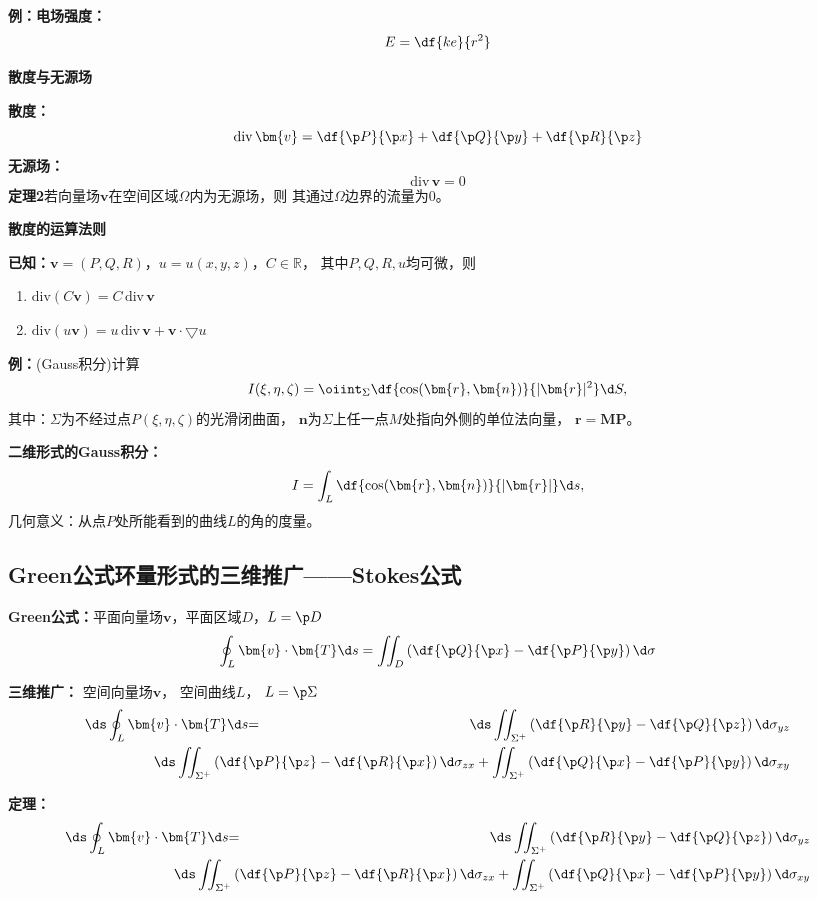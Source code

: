 {\bf 例：}{\bf 电场强度：}
$${E=\df{ke}{r^2}}$$

{\bf 散度与无源场}

{\bf 散度：}
$${\mathrm{div}\,\bm{v}=\df{\p P}{\p x}+\df{\p Q}{\p y}+\df{\p R}{\p
z}}$$ 
{\bf 无源场：}
$${\mathrm{div}\,\bm{v}=0}$$ 
{\bf 定理2}若向量场$\bm{v}$在空间区域$\Omega$内为无源场，则
其通过$\Omega$边界的流量为$0$。

{\bf 散度的运算法则}

{\bf 已知：}$\bm{v}=(P,Q,R)$，$u=u(x,y,z)$，$C\in\mathbb{R}$， 
其中$P,Q,R,u$均可微，则 
\begin{enumerate}[(1)]
  \setlength{\itemindent}{1cm}
  \item ${\mathrm{div}(C\bm{v}) =C\,\mathrm{div}\,\bm{v}}$ 
  \item ${\mathrm{div}(u\bm{v}) =u\,\mathrm{div}\,\bm{v}
  +\bm{v}\cdot\bigtriangledown u}$
\end{enumerate}

{\bf 例：}(Gauss积分)计算
$$I(\xi,\eta,\zeta)=\oiint_{\Sigma}
\df{\cos(\bm{r},\bm{n})}{|\bm{r}|^2}\d S,$$
其中：$\Sigma$为不经过点$P(\xi,\eta,\zeta)$的光滑闭曲面，
$\bm{n}$为$\Sigma$上任一点$M$处指向外侧的单位法向量，
$\bm{r}=\bm{MP}$。

{\bf 二维形式的Gauss积分：}
$$I=\int_L\df{\cos(\bm{r},\bm{n})}{|\bm{r}|}\d s,$$
几何意义：从点$P$处所能看到的曲线$L$的角的度量。

\subsection{Green公式环量形式的三维推广——Stokes公式}

{\bf Green公式：}平面向量场$\bm{v}$，平面区域$D$，$L=\p D$ 
$${\oint_L\bm{v}\cdot\bm{T}\d s=\iint_D
\left(\df{\p Q}{\p x}-\df{\p P}{\p y}\right)\d\sigma}$$
 
{\bf 三维推广：} 空间向量场$\bm{v}$， 空间曲线$L$， $L=\p\Sigma$ 
\begin{eqnarray*}
	{\ds\oint_L\bm{v}\cdot\bm{T}\d s}&{=}&
	{\ds\iint_{\Sigma^+}\left(\df{\p R}{\p y}-\df{\p Q}{\p
	z}\right)\d\sigma_{yz}}\\ 
	&& {\hspace{-3cm}\ds\iint_{\Sigma^+}\left(\df{\p P}{\p
	z}-\df{\p R}{\p x}\right)\d\sigma_{zx}
	+\iint_{\Sigma^+}\left(\df{\p Q}{\p x}-\df{\p P}{\p y}\right)\d\sigma_{xy}}
\end{eqnarray*}

{\bf 定理：}
\begin{eqnarray*}
	{\ds\oint_L\bm{v}\cdot\bm{T}\d s}&{=}&
	{\ds\iint_{\Sigma^+}\left(\df{\p R}{\p y}-\df{\p Q}{\p
	z}\right)\d\sigma_{yz}}\\ 
	&& {\hspace{-2cm}\ds\iint_{\Sigma^+}\left(\df{\p P}{\p
	z}-\df{\p R}{\p x}\right)\d\sigma_{zx}
	+\iint_{\Sigma^+}\left(\df{\p Q}{\p x}-\df{\p P}{\p y}\right)\d\sigma_{xy}}
\end{eqnarray*}

